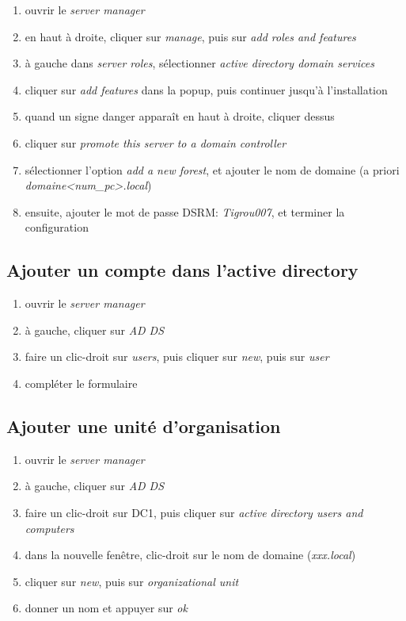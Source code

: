 \documentclass[a4paper]{article}
\begin{document}
\begin{enumerate}
    \item ouvrir le \textit{server manager}
    \item en haut à droite, cliquer sur \textit{manage}, puis sur \textit{add roles and features}
    \item à gauche dans \textit{server roles}, sélectionner \textit{active directory domain services}
    \item cliquer sur \textit{add features} dans la popup, puis continuer jusqu'à l'installation
    \item quand un signe danger apparaît en haut à droite, cliquer dessus
    \item cliquer sur \textit{promote this server to a domain controller}
    \item sélectionner l'option \textit{add a new forest}, et ajouter le nom de domaine (a priori \textit{domaine<num\_pc>.local})
    \item ensuite, ajouter le mot de passe DSRM: \textit{Tigrou007}, et terminer la configuration
\end{enumerate}





\subsection{Ajouter un compte dans l'active directory}



\begin{enumerate}
    \item ouvrir le \textit{server manager}
    \item à gauche, cliquer sur \textit{AD DS}
    \item faire un clic-droit sur \textit{users}, puis cliquer sur \textit{new}, puis sur \textit{user}
    \item compléter le formulaire
\end{enumerate}





\subsection{Ajouter une unité d'organisation}



\begin{enumerate}
    \item ouvrir le \textit{server manager}
    \item à gauche, cliquer sur \textit{AD DS}
    \item faire un clic-droit sur DC1, puis cliquer sur \textit{active directory users and computers}
    \item dans la nouvelle fenêtre, clic-droit sur le nom de domaine (\textit{xxx.local})
    \item cliquer sur \textit{new}, puis sur \textit{organizational unit}
    \item donner un nom et appuyer sur \textit{ok}
\end{enumerate}
\end{document}
